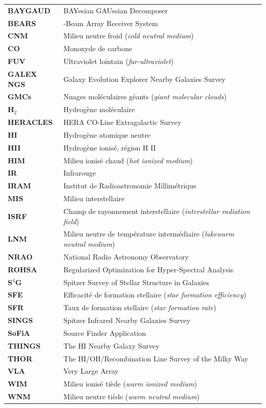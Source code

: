 \begingroup
\renewcommand{\arraystretch}{1.1}
\begin{table}[H]
	\centering
	\begin{tabular}{>{\bfseries}l >{\raggedright\arraybackslash}p{}}
		\hline\hline
		BAYGAUD & BAYesian GAUssian Decomposer\\
		BEARS & 25-Beam Array Receiver System\\
		CNM & Milieu neutre froid (\textit{cold neutral medium})\\
		CO & Monoxyde de carbone\\
		FUV & Ultraviolet lointain (\textit{far-ultraviolet})\\
		GALEX NGS & Galaxy Evolution Explorer Nearby Galaxies Survey\\
		GMCs & Nuages moléculaires géants (\textit{giant molecular clouds})\\
		H$_2$ & Hydrogène moléculaire\\
		HERACLES & HERA CO-Line Extragalactic Survey\\
		HI & Hydrogène atomique neutre\\
		HII & Hydrogène ionisé, région H II\\
		HIM & Milieu ionisé chaud (\textit{hot ionized medium})\\
		IR & Infrarouge \\
		IRAM & Institut de Radioastronomie Millimétrique\\
		MIS & Milieu interstellaire \\
		ISRF & Champ de rayonnement interstellaire (\textit{interstellar radiation field})\\
		LNM & Milieu neutre de température intermédiaire (\textit{lukewarm neutral medium})\\
		NRAO & National Radio Astronomy Observatory\\
		ROHSA & Regularized Optimization for Hyper-Spectral Analysis\\
		S$^4$G & Spitzer Survey of Stellar Structure in Galaxies\\
		SFE & Efficacité de formation stellaire (\textit{star formation efficiency})\\
		SFR & Taux de formation stellaire (\textit{star formation rate})\\
		SINGS & Spitzer Infrared Nearby Galaxies Survey\\
		SoFiA & Source Finder Application\\
		THINGS & The HI Nearby Galaxy Survey\\
		THOR & The HI/OH/Recombination Line Survey of the Milky Way\\
		VLA & Very Large Array\\
		WIM & Milieu ionisé tiède (\textit{warm ionized medium})\\
		WNM & Milieu neutre tiède (\textit{warm neutral medium})\\
		\hline\hline
	\end{tabular}
\end{table}
\endgroup
\newpage

